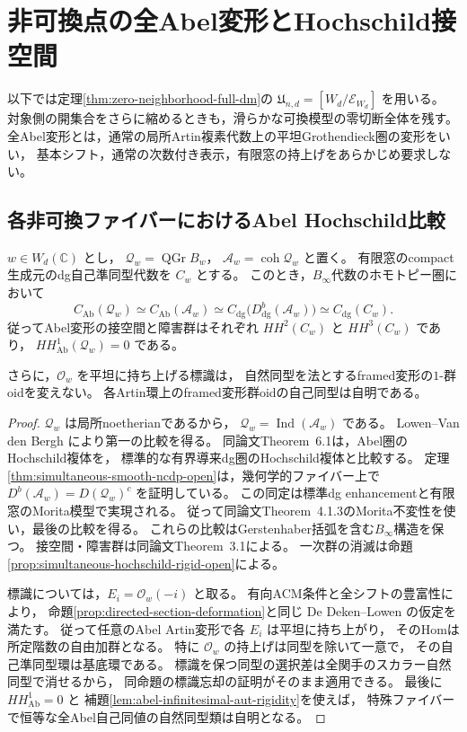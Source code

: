 \section{非可換点の全Abel変形とHochschild接空間}
\label{sec:noncommutative-abel-versality}

以下では定理\ref{thm:zero-neighborhood-full-dm}の
$\mathfrak U_{n,d}=[W_d/\mathcal E_{W_d}]$ を用いる。
対象側の開集合をさらに縮めるときも，滑らかな可換模型の零切断全体を残す。
全Abel変形とは，通常の局所Artin複素代数上の平坦Grothendieck圏の変形をいい，
基本シフト，通常の次数付き表示，有限窓の持上げをあらかじめ要求しない。

\subsection{各非可換ファイバーにおけるAbel Hochschild比較}

\begin{proposition}\label{prop:noncommutative-abel-hochschild}
$w\in W_d(\mathbb C)$ とし，
$\mathcal Q_w=\operatorname{QGr}B_w$，
$\mathcal A_w=\operatorname{coh}\mathcal Q_w$ と置く。
有限窓のcompact生成元のdg自己準同型代数を $C_w$ とする。
このとき，$B_\infty$代数のホモトピー圏において
\[
 C_{\mathrm{Ab}}(\mathcal Q_w)
 \simeq C_{\mathrm{Ab}}(\mathcal A_w)
 \simeq C_{\mathrm{dg}}\bigl(D^b_{\mathrm{dg}}(\mathcal A_w)\bigr)
 \simeq C_{\mathrm{dg}}(C_w).
\]
従ってAbel変形の接空間と障害群はそれぞれ
$HH^2(C_w)$ と $HH^3(C_w)$ であり，
$HH^1_{\mathrm{Ab}}(\mathcal Q_w)=0$ である。

さらに，$\mathcal O_w$ を平坦に持ち上げる標識は，
自然同型を法とするframed変形の$1$-群oidを変えない。
各Artin環上のframed変形群oidの自己同型は自明である。
\end{proposition}
\begin{proof}
$\mathcal Q_w$ は局所noetherianであるから，
$\mathcal Q_w=\operatorname{Ind}(\mathcal A_w)$ である。
Lowen--Van den Bergh \cite[Corollary~6.8]{LowenVdBHochschild}により第一の比較を得る。
同論文Theorem~6.1は，Abel圏のHochschild複体を，
標準的な有界導来dg圏のHochschild複体と比較する。
定理\ref{thm:simultaneous-smooth-ncdp-open}は，幾何学的ファイバー上で
$D^b(\mathcal A_w)=D(\mathcal Q_w)^c$ を証明している。
この同定は標準dg enhancementと有限窓のMorita模型で実現される。
従って同論文Theorem~4.1.3のMorita不変性を使い，最後の比較を得る。
これらの比較はGerstenhaber括弧を含む$B_\infty$構造を保つ。
接空間・障害群は同論文Theorem~3.1による。
一次群の消滅は命題\ref{prop:simultaneous-hochschild-rigid-open}による。

標識については，$E_i=\mathcal O_w(-i)$ と取る。
有向ACM条件と全シフトの豊富性により，
命題\ref{prop:directed-section-deformation}と同じ
De Deken--Lowen \cite[Theorem~4.5, Proposition~4.6]{DDL2011}の仮定を満たす。
従って任意のAbel Artin変形で各 $E_i$ は平坦に持ち上がり，
そのHomは所定階数の自由加群となる。
特に $\mathcal O_w$ の持上げは同型を除いて一意で，
その自己準同型環は基底環である。
標識を保つ同型の選択差は全関手のスカラー自然同型で消せるから，
同命題の標識忘却の証明がそのまま適用できる。
最後に $HH^1_{\mathrm{Ab}}=0$ と
補題\ref{lem:abel-infinitesimal-aut-rigidity}を使えば，
特殊ファイバーで恒等な全Abel自己同値の自然同型類は自明となる。
\end{proof}

